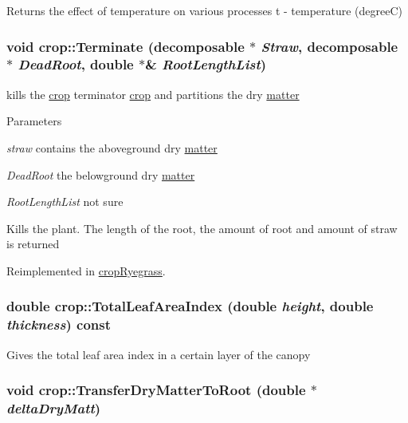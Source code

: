 \label{classcrop_af01aa0fd15613a9e2fcb2a23ca089d5f}
Returns the effect of temperature on various processes t -\/ temperature (degreeC) \hypertarget{classcrop_a8b5cf5b385f82405af121592f7106fc2}{
\subsubsection[{Terminate}]{\setlength{\rightskip}{0pt plus 5cm}void crop::Terminate ({\bf decomposable} $\ast$ {\em Straw}, \/  {\bf decomposable} $\ast$ {\em DeadRoot}, \/  double $\ast$\& {\em RootLengthList})}}
\label{classcrop_a8b5cf5b385f82405af121592f7106fc2}


kills the \hyperlink{classcrop}{crop} terminator \hyperlink{classcrop}{crop} and partitions the dry \hyperlink{classmatter}{matter} 
\begin{DoxyParams}{Parameters}
\item[{\em straw}]contains the aboveground dry \hyperlink{classmatter}{matter} \item[{\em DeadRoot}]the belowground dry \hyperlink{classmatter}{matter} \item[{\em RootLengthList}]not sure\end{DoxyParams}
Kills the plant. The length of the root, the amount of root and amount of straw is returned 

Reimplemented in \hyperlink{classcrop_ryegrass_a9a97cb45a3f91020ccf85f6fabcc532a}{cropRyegrass}.\hypertarget{classcrop_aef3e13efa427477cd8ce5aa070c3e2cb}{
\subsubsection[{TotalLeafAreaIndex}]{\setlength{\rightskip}{0pt plus 5cm}double crop::TotalLeafAreaIndex (double {\em height}, \/  double {\em thickness}) const}}
\label{classcrop_aef3e13efa427477cd8ce5aa070c3e2cb}
Gives the total leaf area index in a certain layer of the canopy \hypertarget{classcrop_aeb0993f2a6d2f21d30a5c24bbd46833e}{
\subsubsection[{TransferDryMatterToRoot}]{\setlength{\rightskip}{0pt plus 5cm}void crop::TransferDryMatterToRoot (double $\ast$ {\em deltaDryMatt})}}
\label{classcrop_aeb0993f2a6d2f21d30a5c24bbd46833e}


